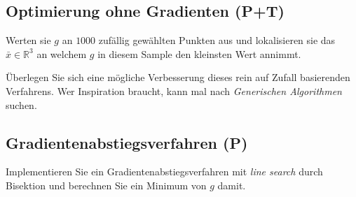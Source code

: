 \documentclass[]{book}
\theoremstyle{definition}
\theoremstyle{definition}
\theoremstyle{definition}
\theoremstyle{definition}
\theoremstyle{remark}
\begin{document}
\hypertarget{optimierung-ohne-gradienten-pt}{%
\subsection{Optimierung ohne Gradienten (P+T)}\label{optimierung-ohne-gradienten-pt}}

Werten sie \(g\) an \(1000\) zufällig gewählten Punkten aus und lokalisieren sie das \(\bar x \in \mathbb R^{3}\) an welchem \(g\) in diesem Sample den kleinsten Wert annimmt.

Überlegen Sie sich eine mögliche Verbesserung dieses rein auf Zufall basierenden Verfahrens. Wer Inspiration braucht, kann mal nach \emph{Generischen Algorithmen} suchen.

\hypertarget{gradientenabstiegsverfahren-p}{%
\subsection{Gradientenabstiegsverfahren (P)}\label{gradientenabstiegsverfahren-p}}

Implementieren Sie ein Gradientenabstiegsverfahren mit \emph{line search} durch Bisektion und berechnen Sie ein Minimum von \(g\) damit.
\end{document}
